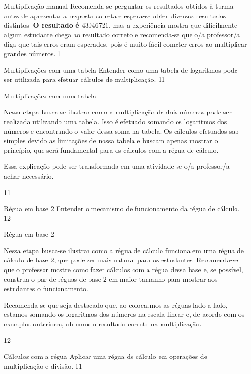 \marginpar{\vspace{.5em}}
\begin{answer}{Multiplicação manual}
{
	Recomenda-se perguntar os resultados obtidos à turma antes de apresentar a resposta correta e espera-se obter diversos resultados distintos. \textbf{O resultado é $43046721$}, mas a experiência mostra que dificilmente algum estudante chega ao resultado correto e recomenda-se que o/a professor/a diga que tais erros eram esperados, pois é muito fácil cometer erros ao multiplicar grandes números.
}{1}
\end{answer}
\clearmargin
\begin{objectives}{Multiplicações com uma tabela}
{
	Entender como uma tabela de logaritmos pode ser utilizada para efetuar cálculos de multiplicação.
}{1}{1}
\end{objectives}
\begin{sugestions}{Multiplicações com uma tabela}
{
	Nessa etapa busca-se ilustrar como a multiplicação de dois números pode ser realizada utilizando uma tabela. Isso é efetuado somando os logaritmos dos números e encontrando o valor dessa soma na tabela. Os cálculos efetuados são simples devido as limitações de nossa tabela e buscam apenas mostrar o princípio, que será fundamental para os cálculos com a régua de cálculo.

	Essa explicação pode ser transformada em uma atividade se o/a professor/a achar necessário.
}{1}{1}
\end{sugestions}
\clearmargin
\begin{objectives}{Régua em base 2}
{
	Entender o mecanismo de funcionamento da régua de cálculo.
}{1}{2}
\end{objectives}
\begin{sugestions}{Régua em base 2}
{
	Nessa etapa busca-se ilustrar como a régua de cálculo funciona em uma régua de cálculo de base $2$, que pode ser mais natural para os estudantes. Recomenda-se que o professor mostre como fazer cálculos com a régua dessa base e, se possível, construa o par de réguas de base $2$ em maior tamanho para mostrar aos estudantes o funcionamento.

	Recomenda-se que seja destacado que, ao colocarmos as réguas lado a lado, estamos somando os logaritmos dos números na escala linear e, de acordo com os exemplos anteriores, obtemos o resultado correto na multiplicação.
}{1}{2}
\end{sugestions}
\clearmargin
\begin{objectives}{Cálculos com a régua}
{
	Aplicar uma régua de cálculo em operações de multiplicação e divisão.
}{1}{1}
\end{objectives}
